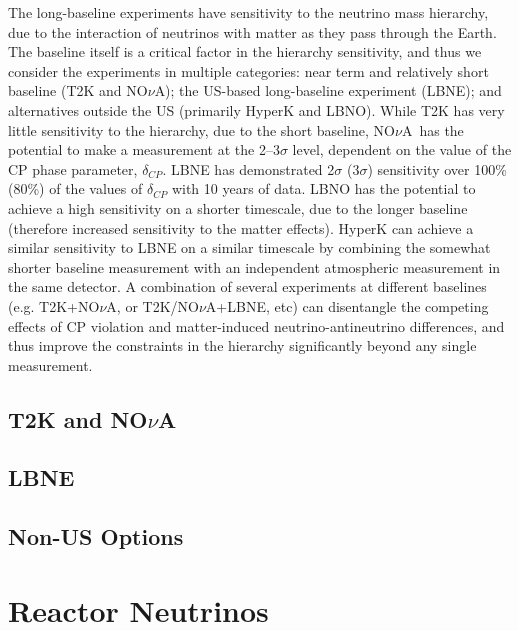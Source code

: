 \documentclass[12pt,letterpaper,amsmath,amssymb,final]{article}
\newcommand{\NOvA}{NO\ensuremath{\nu}A}
\begin{document}
The long-baseline experiments have sensitivity to the neutrino mass
hierarchy, due to the interaction of neutrinos with matter as they
pass through the Earth.  The baseline itself is a critical factor in
the hierarchy sensitivity, and thus we consider the experiments in
multiple categories: near term and relatively short baseline (T2K and
\NOvA); the US-based long-baseline experiment (LBNE); and alternatives
outside the US (primarily HyperK and LBNO).  While T2K has very little
sensitivity to the hierarchy, due to the short baseline, \NOvA\ has the
potential to make a measurement at the 2--3$\sigma$ level, dependent
on the value of the CP phase parameter, $\delta_{CP}$. LBNE has
demonstrated 2$\sigma$ (3$\sigma$) sensitivity over 100\% (80\%) of
the values of $\delta_{CP}$ with 10 years of data.  LBNO has the
potential to achieve a high sensitivity on a shorter timescale, due to
the longer baseline (therefore increased sensitivity to the matter
effects).  HyperK can achieve a similar sensitivity to LBNE on a
similar timescale by combining the somewhat shorter baseline
measurement with an independent atmospheric measurement in the same
detector.  A combination of several
experiments at different baselines (e.g. T2K+\NOvA , or T2K/\NOvA +LBNE,
etc) can disentangle the competing effects of CP violation and
matter-induced neutrino-antineutrino differences, and thus improve the
constraints in the hierarchy significantly beyond any single
measurement. 

\subsection{T2K and \NOvA }\label{s:tn}

\subsection{LBNE}\label{s:lbne}


\subsection{Non-US Options}\label{s:nonus}


\section{Reactor Neutrinos}\label{s:reac}

\end{document}

